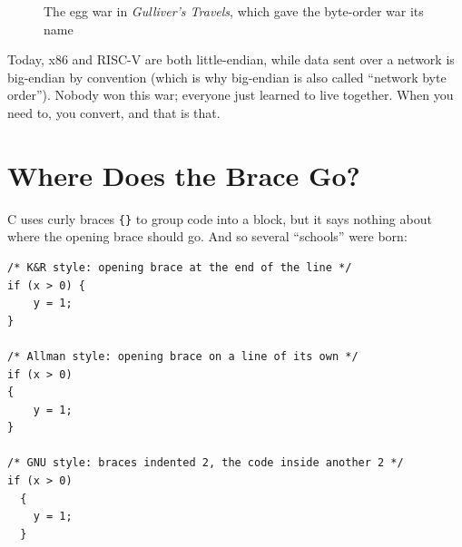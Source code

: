 \begin{figure}[htbp]
  \centering
  \caption{The egg war in \emph{Gulliver's Travels}, which gave the byte-order war its name}
  \label{fig:eggs}
\end{figure}

Today, x86 and RISC-V are both little-endian, while data sent over a network is big-endian by convention (which is why big-endian is also called ``network byte order''). Nobody won this war; everyone just learned to live together. When you need to, you convert, and that is that.

\section{Where Does the Brace Go?}

C uses curly braces \texttt{\{\}} to group code into a block, but it says nothing about where the opening brace should go. And so several ``schools'' were born:

\begin{verbatim}
/* K&R style: opening brace at the end of the line */
if (x > 0) {
    y = 1;
}

/* Allman style: opening brace on a line of its own */
if (x > 0)
{
    y = 1;
}

/* GNU style: braces indented 2, the code inside another 2 */
if (x > 0)
  {
    y = 1;
  }
\end{verbatim}

